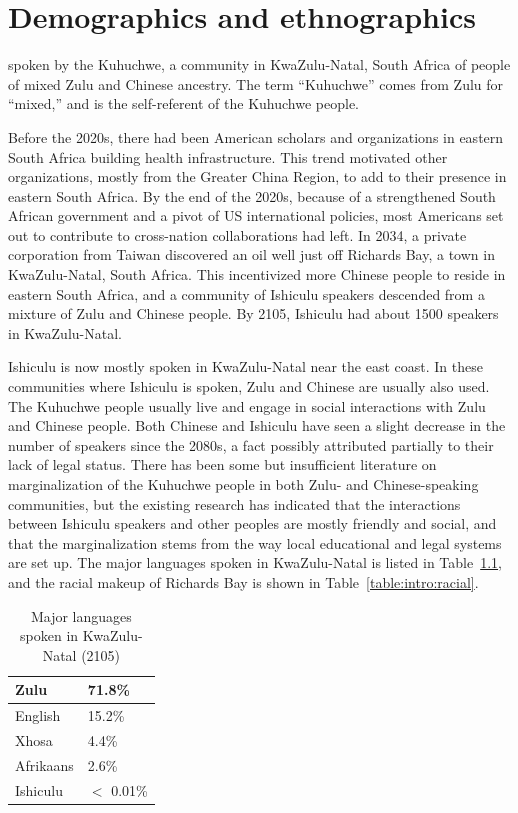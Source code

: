 
\chapter{Demographics and ethnographics}

 spoken by the Kuhuch\textramshorns we, a community in KwaZulu-Natal, South Africa of people of mixed Zulu and Chinese ancestry. The term ``Kuhuch\textramshorns we'' comes from Zulu for ``mixed,'' and is the self-referent of the Kuhuch\textramshorns we people.

Before the 2020s, there had been American scholars and organizations in eastern South Africa building health infrastructure. This trend motivated other organizations, mostly from the Greater China Region, to add to their presence in eastern South Africa. By the end of the 2020s, because of a strengthened South African government and a pivot of US international policies, most Americans set out to contribute to cross-nation collaborations had left. In 2034, a private corporation from Taiwan discovered an oil well just off Richards Bay, a town in KwaZulu-Natal, South Africa. This incentivized more Chinese people to reside in eastern South Africa, and a community of Ishiculu speakers descended from a mixture of Zulu and Chinese people. By 2105, Ishiculu had about 1500 speakers in KwaZulu-Natal.

Ishiculu is now mostly spoken in KwaZulu-Natal near the east coast. In these communities where Ishiculu is spoken, Zulu and Chinese are usually also used. The Kuhuch\textramshorns we people usually live and engage in social interactions with Zulu and Chinese people. Both Chinese and Ishiculu have seen a slight decrease in the number of speakers since the 2080s, a fact possibly attributed partially to their lack of legal status. There has been some but insufficient literature on marginalization of the Kuhuch\textramshorns we people in both Zulu- and Chinese-speaking communities, but the existing research has indicated that the interactions between Ishiculu speakers and other peoples are mostly friendly and social, and that the marginalization stems from the way local educational and legal systems are set up. The major languages spoken in KwaZulu-Natal is listed in Table~\ref{table:intro:languages}, and the racial makeup of Richards Bay is shown in Table~\ref{table:intro:racial}.

\begin{table}
\centering
\begin{tabular}{l|l}
Zulu & 71.8\% \\
\hline
English & 15.2\% \\
\hline
Xhosa & 4.4\% \\
\hline
Afrikaans & 2.6\% \\
\hline
Ishiculu & $<$ 0.01\%
\end{tabular}
\caption{Major languages spoken in KwaZulu-Natal (2105)}
\label{table:intro:languages}
\end{table}


